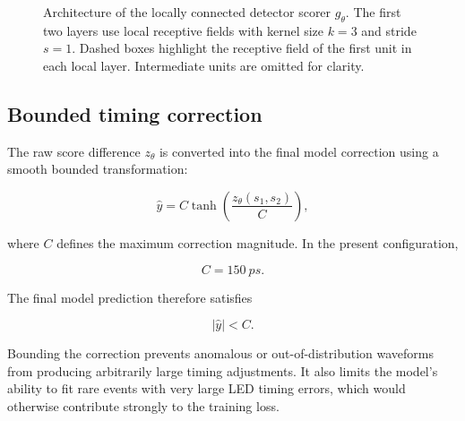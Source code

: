 \begin{figure}[t]
{%
}

\caption{
Architecture of the locally connected detector scorer \(g_\theta\).
The first two layers use local receptive fields with kernel size \(k=3\)
and stride \(s=1\). Dashed boxes highlight the receptive field of the
first unit in each local layer. Intermediate units are omitted for clarity.
}
\label{fig:local-architecture}

\end{figure}

\subsection{Bounded timing correction}

The raw score difference \(z_\theta\) is converted into the final model correction using a smooth bounded transformation:

\begin{equation}
    \widehat{y}
    =
    C
    \tanh\left(
        \frac{z_\theta(s_1,s_2)}{C}
    \right),
\end{equation}

where \(C\) defines the maximum correction magnitude. In the present configuration,

\begin{equation}
    C = \SI{150}{ps}.
\end{equation}

The final model prediction therefore satisfies

\begin{equation}
    |\widehat{y}| < C.
\end{equation}

Bounding the correction prevents anomalous or out-of-distribution waveforms from producing arbitrarily large timing adjustments. 
It also limits the model's ability to fit rare events with very large LED timing errors, which would otherwise contribute strongly 
to the training loss.

